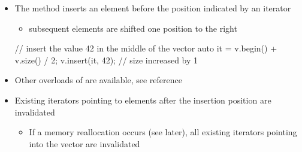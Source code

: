 \begin{frame}[fragile]{ \insertcontinuationtext}

  \begin{itemize}
  \item The  method inserts an element before the position
    indicated by an iterator
    \begin{itemize}
    \item subsequent elements are shifted one position to the right
    \end{itemize}
    \begin{codeblock}
// insert the value 42 in the middle of the vector
auto it = v.begin() + v.size() / 2;
v.insert(it, 42);                   // size increased by 1\end{codeblock}

  \item<2-> Other overloads of  are available, see reference
  \item<3-> Existing iterators pointing to elements after the insertion position
    are invalidated
    \begin{itemize}
    \item If a memory reallocation occurs (see later), all existing iterators
      pointing into the vector are invalidated
    \end{itemize}
  \end{itemize}

\end{frame}

